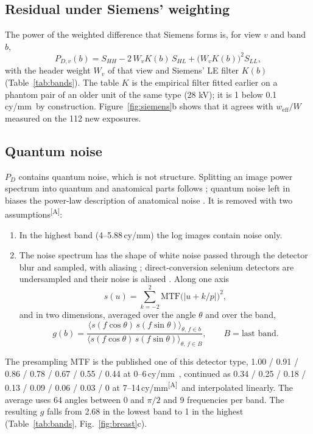 \documentclass[11pt,a4paper]{article}
\newcommand{\weff}{w_\mathrm{eff}}
\newcommand{\As}{\textsuperscript{[A]}}
\newcommand{\cymm}{\,cy/mm}
\begin{document}
\subsection{Residual under Siemens' weighting}
The power of the weighted difference that Siemens forms is, for view $v$ and band $b$,
\begin{equation}
P_{D,v}(b) = S_{HH} - 2\,W_vK(b)\,S_{HL} + \big(W_vK(b)\big)^2 S_{LL},
\label{eq:PDbreast}
\end{equation}
with the header weight $W_v$ of that view and Siemens' LE filter $K(b)$ (Table~\ref{tab:bands}). The table $K$ is
the empirical filter fitted earlier on a phantom pair of an older unit of the same type (28 kV); it is 1 below
0.1\cymm\ by construction. Figure~\ref{fig:siemens}b shows that it agrees with $\weff/W$ measured on the 112 new
exposures.

\subsection{Quantum noise}\label{sec:noise}
$P_D$ contains quantum noise, which is not structure. Splitting an image power spectrum into quantum and
anatomical parts follows \cite{hill2013a}; quantum noise left in biases the power-law description of anatomical
noise \cite{mainprize2012}. It is removed with two assumptions\As:
\begin{enumerate}
\item In the highest band (4--5.88\cymm) the log images contain noise only.
\item The noise spectrum has the shape of white noise passed through the detector blur and sampled, with aliasing
\cite{dobbins1995,albert2000,cunningham2000}; direct-conversion selenium detectors are undersampled and their noise is
aliased \cite{zhao1997,zhao2003}. Along one axis
\begin{equation}
s(u)=\sum_{k=-2}^{2}\mathrm{MTF}\!\big(|u+k/p|\big)^2,
\end{equation}
and in two dimensions, averaged over the angle $\theta$ and over the band,
\begin{equation}
g(b)=\frac{\big\langle s(f\cos\theta)\,s(f\sin\theta)\big\rangle_{\theta,\,f\in b}}{\big\langle s(f\cos\theta)\,s(f\sin\theta)\big\rangle_{\theta,\,f\in B}},
\qquad B=\text{last band}.
\label{eq:g}
\end{equation}
\end{enumerate}
The presampling MTF is the published one of this detector type, 1.00 / 0.91 / 0.86 / 0.78 / 0.67 / 0.55 / 0.44 at
0--6\cymm\ \cite{nhsbsp}, continued as 0.34 / 0.25 / 0.18 / 0.13 / 0.09 / 0.06 / 0.03 / 0 at 7--14\cymm\As\ and
interpolated linearly. The average uses 64 angles between 0 and $\pi/2$ and 9 frequencies per band. The resulting
$g$ falls from 2.68 in the lowest band to 1 in the highest (Table~\ref{tab:bands}, Fig.~\ref{fig:breast}c).
\end{document}
